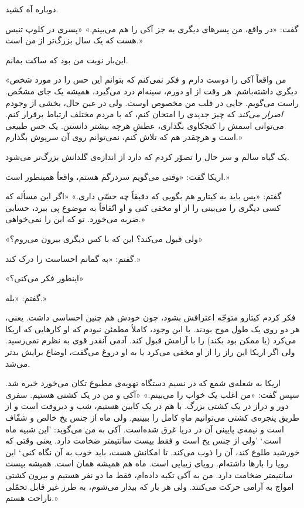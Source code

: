 \documentclass[a5paper]{book}
\begin{document}
دوباره آه کشید.

گفت: «در واقع، من پسرهای دیگری به جز آکی را هم می‌بینم.» «پسری در کلوپ تنیس هست که یک سال بزرگ‌تر از من است.»

این‌بار نوبت من بود که ساکت بمانم.

«من واقعاً آکی را دوست دارم و فکر نمی‌کنم که بتوانم این حس را در مورد شخص دیگری داشته‌باشم. هر وقت از او دورم، سینه‌ام درد می‌گیرد، همیشه یک جای مشخّص. راست می‌گویم. جایی در قلب من مخصوص اوست. ولی در عین حال، بخشی از وجودم \emph{اصرار می‌کند} که چیز جدیدی را امتحان کنم، که با مردم مختلف ارتباط برقرار کنم. می‌توانی اسمش را کنجکاوی بگذاری، عطشِ هرچه بیشتر دانستن. یک حس طبیعی است و هرچقدر هم که تلاش کنم، نمی‌توانم روی آن سرپوش بگذارم.»

یک گیاه سالم و سر حال را تصوّر کردم که دارد از اندازه‌ی گلدانش بزرگ‌تر می‌شود.

اریکا گفت: «وقتی می‌گویم سردرگم هستم، واقعاً همینطور است.»

گفتم: «پس باید به کیتارو هم بگویی که دقیقاً چه حسّی داری.» «اگر این مسأله که کسی دیگری را می‌بینی را از او مخفی کنی و او اتّفاقاً به موضوع پی ببرد، حسابی ضربه می‌خورد. تو که این را نمی‌خواهی.»

«ولی قبول می‌کند؟ این که با کس دیگری بیرون می‌روم؟»

گفتم: «به گمانم احساست را درک کند.»

«اینطور فکر می‌کنی؟»

گفتم: «بله.»

فکر کردم کیتارو متوجّه اعترافش بشود، چون خودش هم چنین احساسی داشت. یعنی، هر دو روی یک طول موج بودند. با این وجود، کاملاُ مطمئن نبودم که او کارهایی که اریکا می‌کرد (یا ممکن بود بکند) را با آرامش قبول کند. آدمی آنقدر قوی به نظرم نمی‌رسید. ولی اگر اریکا این راز را از او مخفی می‌کرد یا به او دروغ می‌گفت، اوضاع برایش بدتر می‌شد.

اریکا به شعله‌ی شمع که در نسیم دستگاه تهویه‌ی مطبوع تکان می‌خورد خیره شد. سپس گفت: «من اغلب یک خواب را می‌بینم.» «آکی و من در یک کشتی هستیم. سفری دور و دراز در یک کشتی بزرگ. با هم در یک کابین هستیم، شب و دیروقت است و از طریق پنجره‌ی کشتی می‌توانیم ماهِ کامل را ببینیم. ولی ماه از جنس یخ خالص و شفّاف است و نیمه‌ی پایینی آن در دریا غرق شده‌است. آکی به من می‌گوید: 'این شبیه ماه است.‍‍` 'ولی از جنس یخ است و فقط بیست سانتیمتر ضخامت دارد. یعنی وقتی که خورشید طلوع کند، آن را ذوب می‌کند. تا امکانش هست، باید خوب به آن نگاه کنی.` این رویا را بارها داشته‌ام. رویای زیبایی است. ماه هم همیشه همان است. همیشه بیست سانتیمتر ضخامت دارد. من به آکی تکیه داده‌ام، فقط ما دو نفر هستیم و بیرون کشتی امواج به آرامی حرکت می‌کنند. ولی هر بار که بیدار می‌شوم، به طرز غیر قابل تحمّلی ناراحت هستم.»
\end{document}
